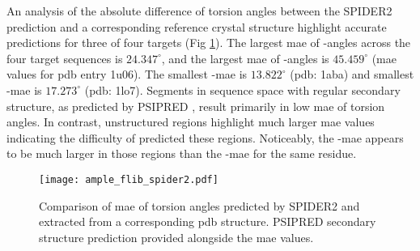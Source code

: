 An analysis of the absolute difference of torsion angles between the SPIDER2 \cite{Heffernan2015-wp} prediction and a corresponding reference crystal structure highlight accurate predictions for three of four targets (Fig \ref{fig:ample_flib_spider2}). The largest \gls{mae} of \textphi-angles across the four target sequences is $24.347^{\circ}$, and the largest \gls{mae} of \textpsi-angles is $45.459^{\circ}$ (\gls{mae} values for \gls{pdb} entry 1u06). The smallest \textphi-\gls{mae} is $13.822^{\circ}$ (\gls{pdb}: 1aba) and smallest \textpsi-\gls{mae} is $17.273^{\circ}$ (\gls{pdb}: 1lo7). Segments in sequence space with regular secondary structure, as predicted by PSIPRED \cite{Jones1999-fi}, result primarily in low \gls{mae} of torsion angles. In contrast, unstructured regions highlight much larger \gls{mae} values indicating the difficulty of predicted these regions. Noticeably, the \textpsi-\gls{mae} appears to be much larger in those regions than the \textphi-\gls{mae} for the same residue.

\begin{figure}[H]
	\centering
	\texttt{[image: ample\_flib\_spider2.pdf]}
	\caption[SPIDER2 torsion angle prediction analysis of Flib targets]{Comparison of \acrlong{mae} of torsion angles predicted by SPIDER2 and extracted from a corresponding \gls{pdb} structure. PSIPRED \cite{Jones1999-fi} secondary structure prediction provided alongside the \gls{mae} values.}
	\label{fig:ample_flib_spider2}
\end{figure}





